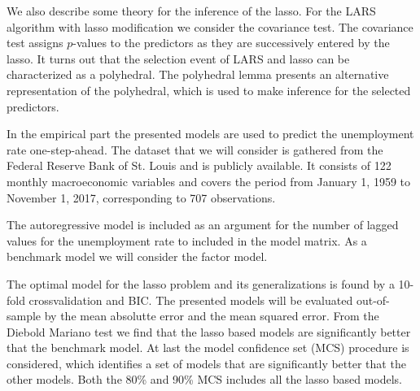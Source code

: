 We also describe some theory for the inference of the lasso.
For the LARS algorithm with lasso modification we consider the covariance test.
The covariance test assigns \(p\)-values to the predictors as they are successively entered by the lasso.
It turns out that the selection event of LARS and lasso can be characterized as a polyhedral.
The polyhedral lemma presents an alternative representation of the polyhedral, which is used to make inference for the selected predictors.

In the empirical part the presented models are used to predict the unemployment rate one-step-ahead.
The dataset that we will consider is gathered from the Federal Reserve Bank of St. Louis and is publicly available.
It consists of 122 monthly macroeconomic variables and covers the period from January 1, 1959 to November 1, 2017, corresponding to 707 observations.

The autoregressive model is included as an argument for the number of lagged values for the unemployment rate to included in the model matrix.
As a benchmark model we will consider the factor model.

The optimal model for the lasso problem and its generalizations is found by a 10-fold crossvalidation and BIC.
The presented models will be evaluated out-of-sample by the mean absolutte error and the mean squared error.
From the Diebold Mariano test we find that the lasso based models are significantly better that the benchmark model. 
At last the model confidence set (MCS) procedure is considered, which identifies a set of models that are significantly better that the other models.
Both the 80\% and 90\% MCS includes all the lasso based models.